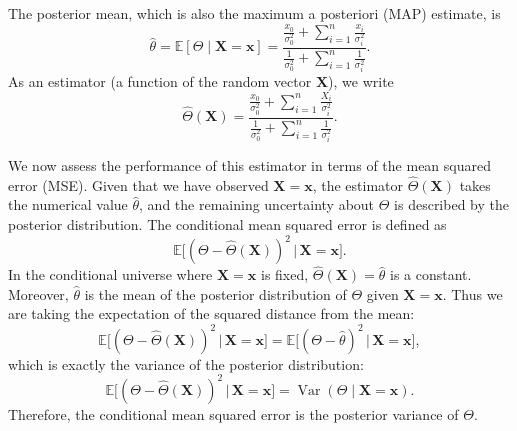 The posterior mean, which is also the maximum a posteriori (MAP) estimate, is
\[
\hat{\theta}
=
\mathbb{E}[\Theta \mid \mathbf{X} = \mathbf{x}]
=
\frac{\displaystyle \frac{x_0}{\sigma_{0}^{2}} + \sum_{i=1}^{n}\frac{x_i}{\sigma_{i}^{2}}}{\displaystyle \frac{1}{\sigma_{0}^{2}} + \sum_{i=1}^{n}\frac{1}{\sigma_{i}^{2}}}.
\]
As an estimator (a function of the random vector \(\mathbf{X}\)), we write
\[
\hat{\Theta}(\mathbf{X})
=
\frac{\displaystyle \frac{x_0}{\sigma_{0}^{2}} + \sum_{i=1}^{n}\frac{X_i}{\sigma_{i}^{2}}}{\displaystyle \frac{1}{\sigma_{0}^{2}} + \sum_{i=1}^{n}\frac{1}{\sigma_{i}^{2}}}.
\]

We now assess the performance of this estimator in terms of the mean squared error (MSE).  
Given that we have observed \(\mathbf{X} = \mathbf{x}\), the estimator \(\hat{\Theta}(\mathbf{X})\) takes the numerical value \(\hat{\theta}\), and the remaining uncertainty about \(\Theta\) is described by the posterior distribution.  
The conditional mean squared error is defined as
\[
\mathbb{E}\big[(\Theta - \hat{\Theta}(\mathbf{X}))^{2} \,\big|\, \mathbf{X} = \mathbf{x}\big].
\]
In the conditional universe where \(\mathbf{X} = \mathbf{x}\) is fixed, \(\hat{\Theta}(\mathbf{X}) = \hat{\theta}\) is a constant.  
Moreover, \(\hat{\theta}\) is the mean of the posterior distribution of \(\Theta\) given \(\mathbf{X} = \mathbf{x}\).  
Thus we are taking the expectation of the squared distance from the mean:
\[
\mathbb{E}\big[(\Theta - \hat{\Theta}(\mathbf{X}))^{2} \,\big|\, \mathbf{X} = \mathbf{x}\big]
=
\mathbb{E}\big[(\Theta - \hat{\theta})^{2} \,\big|\, \mathbf{X} = \mathbf{x}\big],
\]
which is exactly the variance of the posterior distribution:
\[
\mathbb{E}\big[(\Theta - \hat{\Theta}(\mathbf{X}))^{2} \,\big|\, \mathbf{X} = \mathbf{x}\big]
=
\operatorname{Var}(\Theta \mid \mathbf{X} = \mathbf{x}).
\]
Therefore, the conditional mean squared error is the posterior variance of \(\Theta\).

